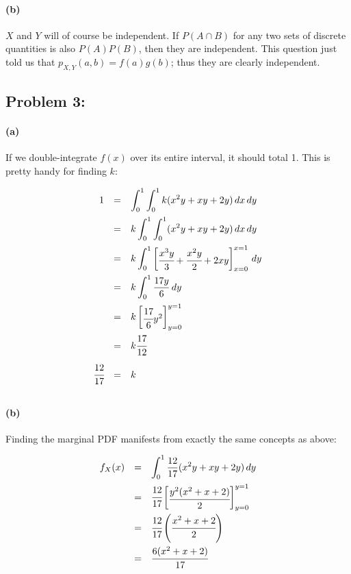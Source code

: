 \documentclass[a4paper]{article}
\begin{document}
\paragraph{(b)} $X$ and $Y$ will of course be independent. If $P(A \cap B)$ for any two sets of discrete quantities is also $P(A)P(B)$, then they are independent. This question just told us that $p_{X, Y}(a,b) = f(a)g(b)$; thus they are clearly independent.

\subsection*{Problem 3:}

\paragraph{(a)} If we double-integrate $f(x)$ over its entire interval, it should total 1. This is pretty handy for finding $k$:

\begin{equation}
\begin{array}{rcl}
1 & = & \displaystyle\int^{1}_{0} \displaystyle\int^{1}_{0} k (x^2y + xy + 2y) \,dx \,dy \\[.15in]
& = & k \displaystyle\int^{1}_{0} \displaystyle\int^{1}_{0} (x^2y + xy + 2y) \,dx \,dy \\[.15in]
& = & k \displaystyle\int^{1}_{0} \begin{bmatrix} \cfrac{x^3y}{3} + \cfrac{x^2y}{2} + 2xy \end{bmatrix}^{x = 1}_{x = 0} \,dy \\[.15in]
& = & k \displaystyle\int^{1}_{0} \frac{17y}{6} \,dy \\[.15in]
& = & k \begin{bmatrix} \cfrac{17}{6} y^2 \end{bmatrix}^{y = 1}_{y = 0} \\[.15in]
& = & k \cfrac{17}{12} \\[.15in]
\cfrac{12}{17} & = & k \\[.15in]
\end{array}
\end{equation}

\paragraph{(b)} Finding the marginal PDF manifests from exactly the same concepts as above:

\begin{equation}
\begin{array}{rcl}
f_{X}(x) & = & \displaystyle\int^{1}_{0} \frac{12}{17} (x^2y + xy + 2y) \,dy \\[.15in]
& = & \cfrac{12}{17} \begin{bmatrix} \cfrac{y^2 (x^2 + x + 2)}{2} \end{bmatrix}^{y = 1}_{y = 0} \\[.15in]
& = & \cfrac{12}{17} \left( \cfrac{x^2 + x + 2}{2} \right) \\[.17in]
& = & \cfrac{6(x^2 + x + 2)}{17} \\[.15in]
\end{array}
\end{equation}
\end{document}
